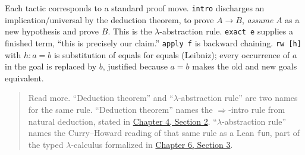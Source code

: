 \begin{mathreading}

Each tactic corresponds to a standard proof move. \texttt{intro} discharges an implication/universal by the deduction theorem, to prove \(A \to B\), \emph{assume} \(A\) as a new hypothesis and prove \(B\). This is the \(\lambda\)-abstraction rule. \texttt{exact e} supplies a finished term, ``this is precisely our claim.'' \texttt{apply f} is backward chaining. \texttt{rw [h]} with \(h : a = b\) is substitution of equals for equals (Leibniz); every occurrence of \(a\) in the goal is replaced by \(b\), justified because \(a = b\) makes the old and new goals equivalent.

\end{mathreading}

\begin{quote}
Read more. ``Deduction theorem'' and ``\(\lambda\)-abstraction rule'' are two names for the same rule. ``Deduction theorem'' names the \(\Rightarrow\)-intro rule from natural deduction, stated in \hyperref[sec:04-propositions-and-proofs:02-logic-recap:1]{Chapter 4, Section 2}. ``\(\lambda\)-abstraction rule'' names the Curry--Howard reading of that same rule as a Lean \texttt{fun}, part of the typed \(\lambda\)-calculus formalized in \hyperref[sec:06-rigor-check:03-typing-rules-and-safety:1]{Chapter 6, Section 3}.
\end{quote}
